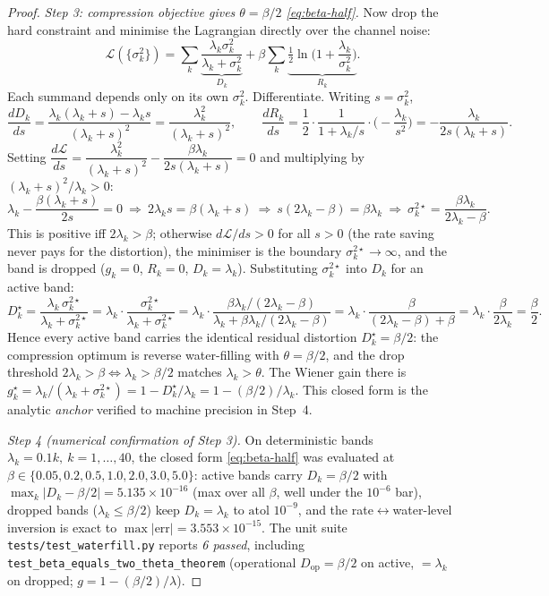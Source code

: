 \begin{proof}
\medskip
\noindent\emph{Step 3: compression objective gives $\theta=\beta/2$ \eqref{eq:beta-half}.}
Now drop the hard constraint and minimise the Lagrangian directly over the channel noise:
\[
\mathcal L(\{\sigma_k^2\})=\sum_k\underbrace{\frac{\lambda_k\sigma_k^2}{\lambda_k+\sigma_k^2}}_{D_k}
+\beta\sum_k\underbrace{\tfrac12\ln\!\Big(1+\frac{\lambda_k}{\sigma_k^2}\Big)}_{R_k}.
\]
Each summand depends only on its own $\sigma_k^2$. Differentiate. Writing $s=\sigma_k^2$,
\[
\frac{dD_k}{ds}=\frac{\lambda_k(\lambda_k+s)-\lambda_k s}{(\lambda_k+s)^2}=\frac{\lambda_k^2}{(\lambda_k+s)^2},
\qquad
\frac{dR_k}{ds}=\frac12\cdot\frac{1}{1+\lambda_k/s}\cdot\Big(-\frac{\lambda_k}{s^2}\Big)=-\frac{\lambda_k}{2s(\lambda_k+s)}.
\]
Setting $\dfrac{d\mathcal L}{ds}=\dfrac{\lambda_k^2}{(\lambda_k+s)^2}-\dfrac{\beta\lambda_k}{2s(\lambda_k+s)}=0$ and multiplying by $(\lambda_k+s)^2/\lambda_k>0$:
\[
\lambda_k-\frac{\beta(\lambda_k+s)}{2s}=0
\ \Longrightarrow\ 2\lambda_k s=\beta(\lambda_k+s)
\ \Longrightarrow\ s(2\lambda_k-\beta)=\beta\lambda_k
\ \Longrightarrow\ \sigma_k^{2\star}=\frac{\beta\lambda_k}{2\lambda_k-\beta}.
\]
This is positive iff $2\lambda_k>\beta$; otherwise $d\mathcal L/ds>0$ for all $s>0$ (the rate saving never pays for the distortion), the minimiser is the boundary $\sigma_k^{2\star}\to\infty$, and the band is dropped ($g_k=0$, $R_k=0$, $D_k=\lambda_k$). Substituting $\sigma_k^{2\star}$ into $D_k$ for an active band:
\[
D_k^\star=\frac{\lambda_k\,\sigma_k^{2\star}}{\lambda_k+\sigma_k^{2\star}}
=\lambda_k\cdot\frac{\sigma_k^{2\star}}{\lambda_k+\sigma_k^{2\star}}
=\lambda_k\cdot\frac{\beta\lambda_k/(2\lambda_k-\beta)}{\lambda_k+\beta\lambda_k/(2\lambda_k-\beta)}
=\lambda_k\cdot\frac{\beta}{(2\lambda_k-\beta)+\beta}
=\lambda_k\cdot\frac{\beta}{2\lambda_k}=\frac{\beta}{2}.
\]
Hence every active band carries the identical residual distortion $D_k^\star=\beta/2$: the compression optimum is reverse water-filling with $\theta=\beta/2$, and the drop threshold $2\lambda_k>\beta\Leftrightarrow\lambda_k>\beta/2$ matches $\lambda_k>\theta$. The Wiener gain there is $g_k^\star=\lambda_k/(\lambda_k+\sigma_k^{2\star})=1-D_k^\star/\lambda_k=1-(\beta/2)/\lambda_k$. This closed form is the analytic \emph{anchor} verified to machine precision in Step~4.

\medskip
\noindent\emph{Step 4 (numerical confirmation of Step 3).}
On deterministic bands $\lambda_k=0.1k,\ k=1,\dots,40$, the closed form \eqref{eq:beta-half} was evaluated at $\beta\in\{0.05,0.2,0.5,1.0,2.0,3.0,5.0\}$: active bands carry $D_k=\beta/2$ with $\max_k|D_k-\beta/2|=5.135\times10^{-16}$ (max over all $\beta$, well under the $10^{-6}$ bar), dropped bands ($\lambda_k\le\beta/2$) keep $D_k=\lambda_k$ to $\text{atol }10^{-9}$, and the rate$\leftrightarrow$water-level inversion is exact to $\max|\text{err}|=3.553\times10^{-15}$. The unit suite \texttt{tests/test\_waterfill.py} reports \emph{6 passed}, including \texttt{test\_beta\_equals\_two\_theta\_theorem} (operational $D_{\mathrm{op}}=\beta/2$ on active, $=\lambda_k$ on dropped; $g=1-(\beta/2)/\lambda$).


\end{proof}
